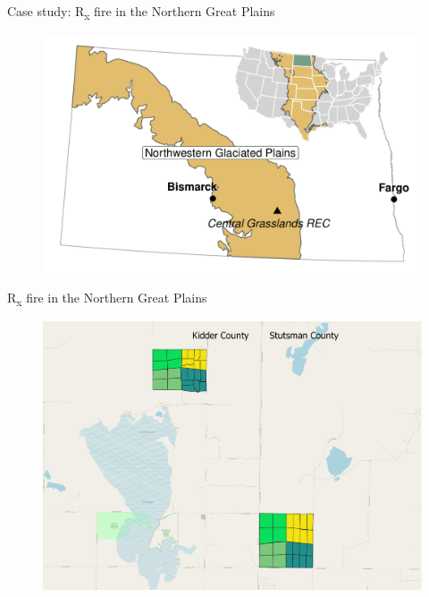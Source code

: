 \documentclass[11pt]{beamer}
\begin{document}
\begin{frame}{Case study: R\textsubscript{x} fire in the Northern Great Plains}
	\begin{center}
		\begin{figure}
			\includegraphics[width=1\linewidth]{figs/region_map-1.pdf} 
		\end{figure}
	\end{center}
\end{frame}

\begin{frame}{R\textsubscript{x} fire in the Northern Great Plains}
	\begin{center}
		\begin{figure}
			\includegraphics[width=1\linewidth]{figs/PBGmaps} 
		\end{figure}
	\end{center}
\end{frame}
\end{document}
